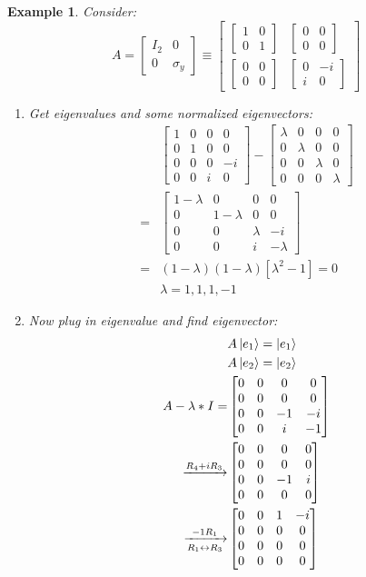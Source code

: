 \documentclass[12pt]{article}
\theoremstyle{plain}
\theoremstyle{nonumberplain}
\theoremstyle{plain}
\newtheorem{example}[lemma]{Example}
\theoremstyle{nonumberplain}
\newcommand\1{{\bf 1}}
\newcommand{\bmat}[1]{\begin{bmatrix*} #1 \end{bmatrix*}} %
\newcommand{\<}{\left\langle}
\renewcommand{\>}{\right\rangle}
\begin{document}
\begin{example}
Consider:
\begin{equation}
A = \bmat{I_2 &0\\ 0 &\sigma_y} \equiv \bmat{\bmat{1 &0\\ 0 &1} &\bmat{0 &0\\ 0 &0}\\ \bmat{0 &0\\ 0 &0} &\bmat{0 &-i\\ i &0}}
\end{equation}
\begin{enumerate}
\item Get eigenvalues and some normalized eigenvectors:
\begin{equation}
\begin{split}
&\bmat{1 &0 &0 &0\\ 0 &1 &0 &0\\ 0 &0 &0 &-i\\ 0 &0 &i &0} - \bmat{\lambda &0 &0 &0\\ 0 &\lambda &0 &0\\ 0 &0 &\lambda &0\\ 0 &0 &0 &\lambda}\\
=&\bmat{1-\lambda &0 &0 &0\\ 0 &1-\lambda &0 &0\\ 0 &0 &\lambda &-i\\ 0 &0 &i &-\lambda}\\
=&(1-\lambda)(1-\lambda)[\lambda^2-1] = 0\\
&\lambda = 1, 1, 1, -1 
\end{split}
\end{equation}
\item Now plug in eigenvalue and find eigenvector:
\begin{equation}
\begin{split}
&A\ket{e_1} = \ket{e_1}\\
&A\ket{e_2} = \ket{e_2}\\
A-\lambda*I = &\bmat{0 &0 &0 &0\\ 0 &0 &0 &0\\ 0 &0 &-1 &-i\\ 0 &0 &i &-1}\\
\xrightarrow{R_4 + iR_3} &\bmat{0 &0 &0 &0\\ 0 &0 &0 &0\\ 0 &0 &-1 &i\\ 0 &0 &0 &0}\\
\xrightarrow[{R_1 \leftrightarrow R_3}]{-1R_1} &\bmat{0 &0 &1 &-i\\ 0 &0 &0 &0\\ 0 &0 &0 &0\\ 0 &0 &0 &0}\\

\end{split}
\end{equation}
\end{enumerate}
\end{example}
\end{document}
